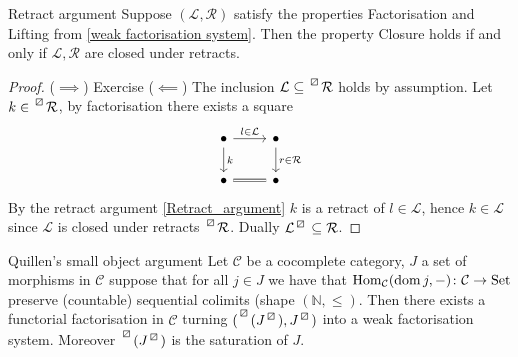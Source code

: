 \begin{lem}{Retract argument}
\label{Retract_argument}
    Suppose $(\mathcal{L}, \mathcal{R})$ satisfy the properties Factorisation and Lifting from \cref{weak factorisation system}.
    Then the property Closure holds if and only if $\mathcal{L}, \mathcal{R}$ are closed under retracts.
\end{lem}

\begin{proof}
    ($\implies$) Exercise
    ($\impliedby$) The inclusion $\mathcal{L} \subseteq \prescript{\lift{}}{}{\mathcal{R}}$ holds by assumption. 
    Let $k \in \prescript{\lift{}}{}{\mathcal{R}}$, by factorisation there exists a square 
    \[
    \begin{tikzcd}
        \bullet 
        \ar[r, "l \in \mathcal{L}"]
        \ar[d, "k"]
        &
        \bullet
        \ar[d, "r \in \mathcal{R}"]
        \\
        \bullet
        \ar[r, equal]
        &
        \bullet
    \end{tikzcd}
    \]
    By the retract argument \cref{Retract_argument} $k$ is a retract of $l \in \mathcal{L}$, hence $k \in \mathcal{L}$ since $\mathcal{L}$ is closed under retracts $\prescript{\lift{}}{}{\mathcal{R}}$. 
    Dually $\mathcal{L}^{\lift{}} \subseteq \mathcal{R}$.
\end{proof}

\begin{thm}{Quillen's small object argument}
\label{Quillen's small object argument}
    Let $\mathcal{C}$ be a cocomplete category, $J$ a set of morphisms in $\mathcal{C}$ suppose that for all $j \in J$ we have that $\operatorname{Hom}_{\mathcal{C}}(\operatorname{dom} j,-)\colon \mathcal{C} \to \operatorname{Set}$ preserve (countable) sequential colimits (shape $(\mathbb{N}, \leq )$.
    Then there exists a functorial factorisation in $\mathcal{C}$ turning $(\prescript{\lift{}}{}{(J^{\lift{}})},J^{\lift{}})$ into a weak factorisation system.
    Moreover $\prescript{\lift{}}{}{(J^{\lift{}})}$ is the saturation of $J$.
\end{thm}

